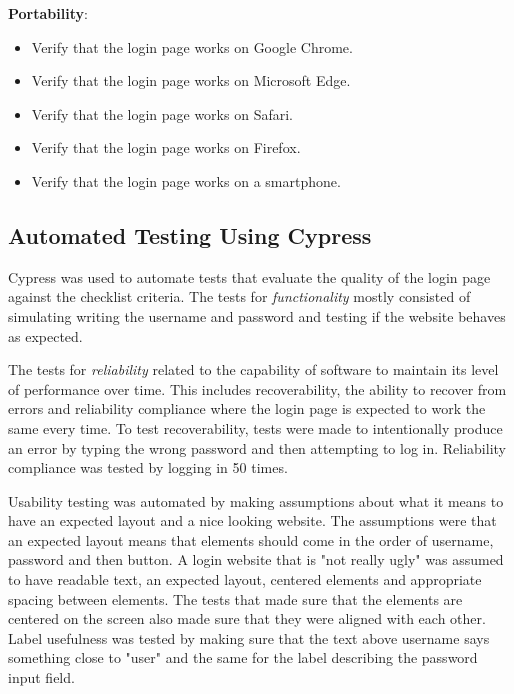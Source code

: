 \documentclass[journal,twocolumn]{IEEEtran}
\begin{document}
\textbf{Portability}:
\begin{itemize}
    \item Verify that the login page works on Google Chrome.
    \item Verify that the login page works on Microsoft Edge.
    \item Verify that the login page works on Safari.
    \item Verify that the login page works on Firefox.
    \item Verify that the login page works on a smartphone.
\end{itemize}

\subsection{Automated Testing Using Cypress}
Cypress was used to automate tests that evaluate the quality of the login page against the checklist criteria. The tests for \textit{functionality} mostly consisted of simulating writing the username and password and testing if the website behaves as expected.

The tests for \textit{reliability} related to the capability of software to maintain its level of performance over time. This includes recoverability, the ability to recover from errors and reliability compliance where the login page is expected to work the same every time. To test recoverability, tests were made to intentionally produce an error by typing the wrong password and then attempting to log in. Reliability compliance was tested by logging in 50 times.

Usability testing was automated by making assumptions about what it means to have an expected layout and a nice looking website. The assumptions were that an expected layout means that elements should come in the order of username, password and then button. A login website that is "not really ugly" was assumed to have readable text, an expected layout, centered elements and appropriate spacing between elements. The tests that made sure that the elements are centered on the screen also made sure that they were aligned with each other. Label usefulness was tested by making sure that the text above username says something close to "user" and the same for the label describing the password input field.

\end{document}
